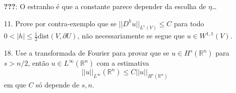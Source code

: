 \documentclass[a4paper, 11pt]{article}
\newcommand{\Rn}{{\mathbb{R}^n}}
\newcommand{\pu}{\partial U}
\begin{document}
\begin{enumerate}
	\textbf{???}: O estranho é que a constante parece depender da escolha de $\eta$\ldots


	\item[11.] Prove por contra-exemplo que se $||D^hu||_{L^1(V)} \leq C$ para todo $0<|h|\leq \frac{1}{2}\text{dist}(V,\pu)$, não necessariamente se segue que $u \in W^{1,1}(V)$.



	\item[18.] Use a transformada de Fourier para provar que se $u \in H^s(\Rn)$ para $s> n/2$, então $u \in L^{\infty}(\Rn)$ com a estimativa \[ ||u||_{L^\infty}(\Rn) \leq C ||u||_{H^s(\Rn)} \] em que $C$ só depende de $s,n$.
\end{enumerate}
\end{document}
